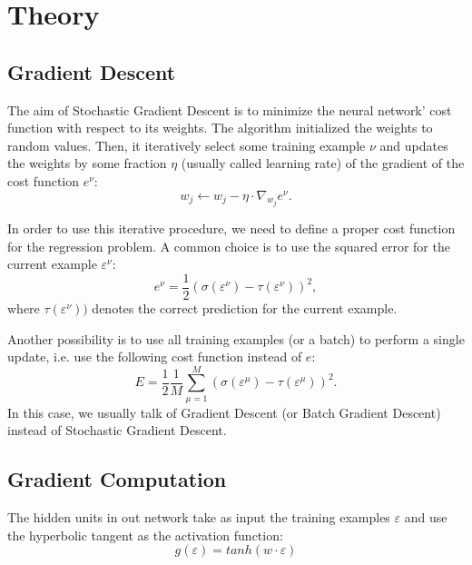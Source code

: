 \section{Theory}
\label{sec:theory}

\subsection{Gradient Descent}
The aim of Stochastic Gradient Descent is to minimize the neural network' cost function with respect to its weights.
The algorithm initialized the weights to random values.
Then, it iteratively select some training example $\nu$ and updates the weights by some fraction $\eta$ (usually called learning rate) of the gradient of the cost function $e^\nu$:
\begin{equation}
    \label{eq:weights-update}
    w_j \leftarrow w_j - \eta \cdot \nabla_{w_j} e^\nu.
\end{equation}

In order to use this iterative procedure, we need to define a proper cost function for the regression problem.
A common choice is to use the squared error for the current example $\varepsilon^\nu$:
\begin{equation}
    \label{eq:cost}
    e^\nu = \frac{1}{2} (\sigma(\varepsilon^\nu) - \tau(\varepsilon^\nu))^2,
\end{equation}
where $\tau(\varepsilon^\nu))$ denotes the correct prediction for the current example.

Another possibility is to use all training examples (or a batch) to perform a single update, i.e. use the following cost function instead of $e$:
\begin{equation}
    \label{eq:cost-total}
    E = \frac{1}{2} \frac{1}{M} \sum_{\mu = 1}^{M} (\sigma(\varepsilon^\mu) - \tau(\varepsilon^\mu))^2.
\end{equation}
In this case, we usually talk of Gradient Descent (or Batch Gradient Descent) instead of Stochastic Gradient Descent.

\subsection{Gradient Computation}
The hidden units in out network take as input the training examples $\varepsilon$ and use the hyperbolic tangent as the activation function:
\begin{equation}
    g(\varepsilon) = tanh(w \cdot \varepsilon)
\end{equation}

